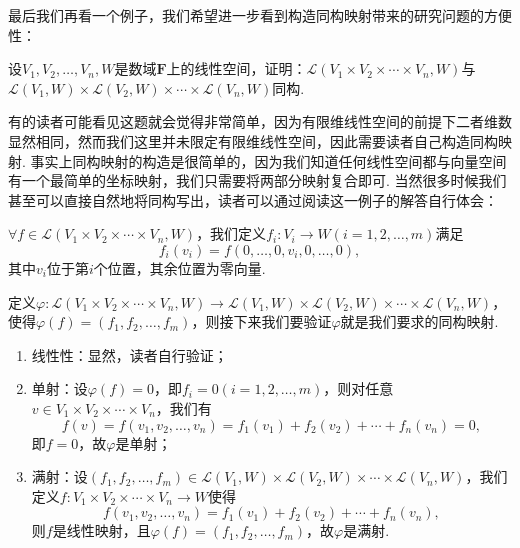 最后我们再看一个例子，我们希望进一步看到构造同构映射带来的研究问题的方便性：
\begin{example}{}{}
    设$V_1,V_2,\ldots,V_n,W$是数域$\mathbf{F}$上的线性空间，证明：$\mathcal{L}(V_1 \times V_2 \times \cdots \times V_n,W)$与$\mathcal{L}(V_1,W) \times \mathcal{L}(V_2,W) \times \cdots \times \mathcal{L}(V_n,W)$同构.
\end{example}
有的读者可能看见这题就会觉得非常简单，因为有限维线性空间的前提下二者维数显然相同，然而我们这里并未限定有限维线性空间，因此需要读者自己构造同构映射. 事实上同构映射的构造是很简单的，因为我们知道任何线性空间都与向量空间有一个最简单的坐标映射，我们只需要将两部分映射复合即可. 当然很多时候我们甚至可以直接自然地将同构写出，读者可以通过阅读这一例子的解答自行体会：

\begin{solution}
    $\forall f\in \mathcal{L}(V_1 \times V_2 \times \cdots \times V_n,W)$，我们定义$f_i:V_i\to W(i=1,2,\ldots,m)$满足
    \[f_i(v_i)=f(0,\ldots,0,v_i,0,\ldots,0),\]
    其中$v_i$位于第$i$个位置，其余位置为零向量.

    定义$\varphi:\mathcal{L}(V_1 \times V_2 \times \cdots \times V_n,W)\to \mathcal{L}(V_1,W) \times \mathcal{L}(V_2,W) \times \cdots \times \mathcal{L}(V_n,W)$，使得$\varphi(f)=(f_1,f_2,\ldots,f_m)$，则接下来我们要验证$\varphi$就是我们要求的同构映射.
    \begin{enumerate}
        \item 线性性：显然，读者自行验证；
        \item 单射：设$\varphi(f)=0$，即$f_i=0(i=1,2,\ldots,m)$，则对任意$v\in V_1 \times V_2 \times \cdots \times V_n$，我们有
              \[f(v)=f(v_1,v_2,\ldots,v_n)=f_1(v_1)+f_2(v_2)+\cdots+f_n(v_n)=0,\]
              即$f=0$，故$\varphi$是单射；
        \item 满射：设$(f_1,f_2,\ldots,f_m)\in \mathcal{L}(V_1,W) \times \mathcal{L}(V_2,W) \times \cdots \times \mathcal{L}(V_n,W)$，我们定义$f:V_1 \times V_2 \times \cdots \times V_n\to W$使得
              \[f(v_1,v_2,\ldots,v_n)=f_1(v_1)+f_2(v_2)+\cdots+f_n(v_n),\]
              则$f$是线性映射，且$\varphi(f)=(f_1,f_2,\ldots,f_m)$，故$\varphi$是满射.
    \end{enumerate}
\end{solution}

